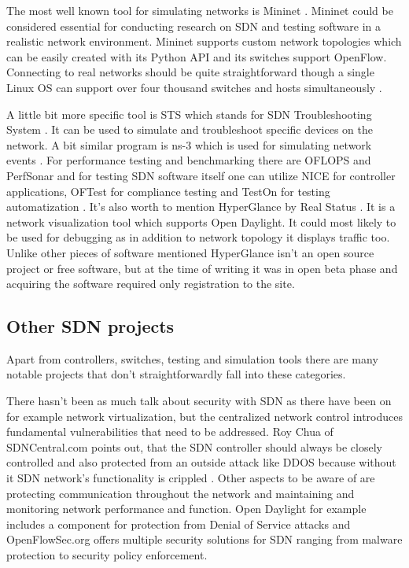 \documentclass[english]{tktltiki2}
\theoremstyle{definition}
\theoremstyle{remark}
\begin{document}
The most well known tool for simulating networks is Mininet \cite{MN14}. Mininet could be considered essential for conducting research on SDN and testing software in a realistic network environment. Mininet supports custom network topologies which can be easily created with its Python API and its switches support OpenFlow. Connecting to real networks should be quite straightforward though a single Linux OS can support  over four thousand switches and hosts simultaneously \cite{MN14}. 

A little bit more specific tool is STS which stands for SDN Troubleshooting System \cite{STS}. It can be used to simulate and troubleshoot specific devices on the network. A bit similar program is ns-3 which is used for simulating network events \cite{NS3}. For performance testing and benchmarking there are OFLOPS and PerfSonar \cite{OFLOPS, Perf} and for testing SDN software itself one can utilize NICE \cite{NICE} for controller applications, OFTest for compliance testing \cite{OFTest} and TestOn for testing automatization \cite{TestOn}. It’s also worth to mention HyperGlance by Real Status \cite{Hyper}. It is a network visualization tool which supports Open Daylight. It could most likely to be used for debugging as in addition to network topology it displays traffic too. Unlike other pieces of software mentioned HyperGlance isn’t an open source project or free software, but at the time of writing it was in open beta phase and acquiring the software required only registration to the site.

\subsection{Other SDN projects}

Apart from controllers, switches, testing and simulation tools there are many notable projects that don’t straightforwardly fall into these categories.

There hasn’t been as much talk about security with SDN as there have been on for example network virtualization, but the centralized network control introduces fundamental vulnerabilities that need to be addressed. Roy Chua of SDNCentral.com points out, that the SDN controller should always be closely controlled and also protected from an outside attack like DDOS because without it SDN network's functionality is crippled \cite{CHU2} . Other aspects to be aware of are protecting communication throughout the network and maintaining and monitoring network performance and function. Open Daylight for example includes a component for protection from Denial of Service attacks and OpenFlowSec.org offers multiple security solutions for SDN ranging from malware protection to security policy enforcement.
\end{document}
